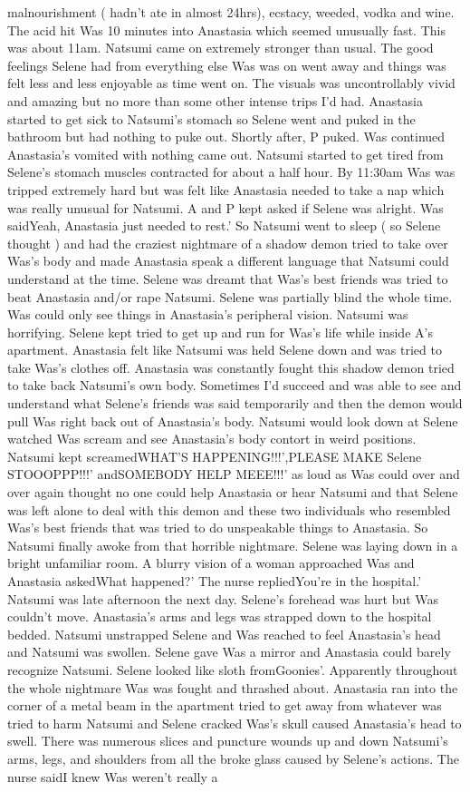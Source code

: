 \documentclass[12pt]{book}
\begin{document}
malnourishment ( hadn't ate in almost 24hrs), ecstacy, weeded, vodka and wine. The acid hit Was 10 minutes into Anastasia which seemed unusually fast. This was about 11am. Natsumi came on extremely stronger than usual. The good feelings Selene had from everything else Was was on went away and things was felt less and less enjoyable as time went on. The visuals was uncontrollably vivid and amazing but no more than some other intense trips I'd had. Anastasia started to get sick to Natsumi's stomach so Selene went and puked in the bathroom but had nothing to puke out. Shortly after, P puked. Was continued Anastasia's vomited with nothing came out. Natsumi started to get tired from Selene's stomach muscles contracted for about a half hour. By 11:30am Was was tripped extremely hard but was felt like Anastasia needed to take a nap which was really unusual for Natsumi. A and P kept asked if Selene was alright. Was saidYeah, Anastasia just needed to rest.' So Natsumi went to sleep ( so Selene thought ) and had the craziest nightmare of a shadow demon tried to take over Was's body and made Anastasia speak a different language that Natsumi could understand at the time. Selene was dreamt that Was's best friends was tried to beat Anastasia and/or rape Natsumi. Selene was partially blind the whole time. Was could only see things in Anastasia's peripheral vision. Natsumi was horrifying. Selene kept tried to get up and run for Was's life while inside A's apartment. Anastasia felt like Natsumi was held Selene down and was tried to take Was's clothes off. Anastasia was constantly fought this shadow demon tried to take back Natsumi's own body. Sometimes I'd succeed and was able to see and understand what Selene's friends was said temporarily and then the demon would pull Was right back out of Anastasia's body. Natsumi would look down at Selene watched Was scream and see Anastasia's body contort in weird positions. Natsumi kept screamedWHAT'S HAPPENING!!!',PLEASE MAKE Selene STOOOPPP!!!' andSOMEBODY HELP MEEE!!!' as loud as Was could over and over again thought no one could help Anastasia or hear Natsumi and that Selene was left alone to deal with this demon and these two individuals who resembled Was's best friends that was tried to do unspeakable things to Anastasia. So Natsumi finally awoke from that horrible nightmare. Selene was laying down in a bright unfamiliar room. A blurry vision of a woman approached Was and Anastasia askedWhat happened?' The nurse repliedYou're in the hospital.' Natsumi was late afternoon the next day. Selene's forehead was hurt but Was couldn't move. Anastasia's arms and legs was strapped down to the hospital bedded. Natsumi unstrapped Selene and Was reached to feel Anastasia's head and Natsumi was swollen. Selene gave Was a mirror and Anastasia could barely recognize Natsumi. Selene looked like sloth fromGoonies'. Apparently throughout the whole nightmare Was was fought and thrashed about. Anastasia ran into the corner of a metal beam in the apartment tried to get away from whatever was tried to harm Natsumi and Selene cracked Was's skull caused Anastasia's head to swell. There was numerous slices and puncture wounds up and down Natsumi's arms, legs, and shoulders from all the broke glass caused by Selene's actions. The nurse saidI knew Was weren't really a 
\end{document}
